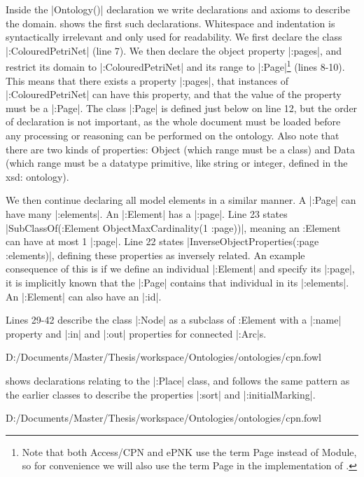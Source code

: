 Inside the
|Ontology()| declaration we write declarations and axioms to describe the
domain.  shows the first such declarations. Whitespace and
indentation is syntactically irrelevant and only used for readability. We first
declare the class |:ColouredPetriNet| (line 7). We then
declare the object property |:pages|, and restrict its domain to |:ColouredPetriNet| and its range
to |:Page|\footnote{Note that both Access/CPN and ePNK use the term Page instead
of Module, so for convenience we will also use the term Page in the
implementation of \thename{}.} (lines 8-10). This means that there exists a
property |:pages|, that instances of |:ColouredPetriNet| can have this property,
and that the value of the property must be a |:Page|. The class |:Page| is
defined just below on line 12, but the order of declaration is not important, as
the whole document must be loaded before any processing or reasoning can be performed on
the ontology. Also note that there are two kinds of properties:
Object (which range must be a class) and Data (which range must be a datatype
primitive, like string or integer, defined in the xsd: ontology).

We then continue declaring all model elements in a similar manner. A |:Page| can
have many |:elements|. An |:Element| has a |:page|. Line 23 states
|SubClassOf(:Element ObjectMaxCardinality(1 :page))|, meaning an :Element can
have at most 1 |:page|.
Line 22 states |InverseObjectProperties(:page :elements)|, defining these
properties as inversely related. An example consequence of this is if we define
an individual |:Element| and specify its |:page|, it is implicitly known that
the |:Page| contains that individual in its |:elements|. An |:Element| can also
have an |:id|.

Lines 29-42 describe the class |:Node| as a subclass of :Element with a |:name|
property and |:in| and |:out| properties for connected |:Arc|s.


{D:/Documents/Master/Thesis/workspace/Ontologies/ontologies/cpn.fowl} 

 shows declarations relating to the |:Place| class, and
follows the same pattern as the earlier classes to describe the properties |:sort| and
|:initialMarking|.


{D:/Documents/Master/Thesis/workspace/Ontologies/ontologies/cpn.fowl} 

